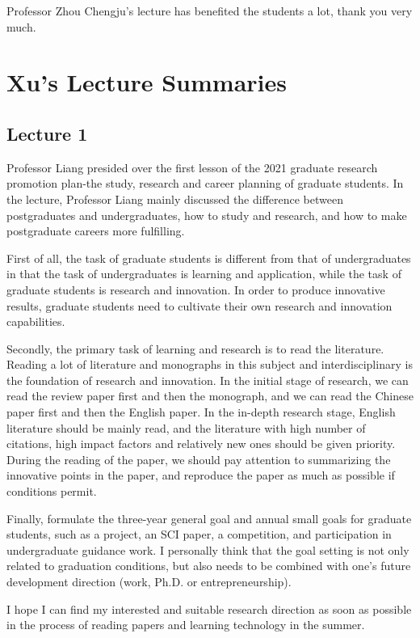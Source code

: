 \documentclass[UTF-8]{ctexart}
\begin{document}
Professor Zhou Chengju’s lecture has benefited the students a lot, thank you very much. 

\section{Xu's Lecture Summaries}

\subsection{Lecture 1}
Professor Liang presided over the first lesson of the 2021 graduate research promotion plan-the study, research and career planning of graduate students. In the lecture, Professor Liang mainly discussed the difference between postgraduates and undergraduates, how to study and research, and how to make postgraduate careers more fulfilling.

First of all, the task of graduate students is different from that of undergraduates in that the task of undergraduates is learning and application, while the task of graduate students is research and innovation. In order to produce innovative results, graduate students need to cultivate their own research and innovation capabilities.

Secondly, the primary task of learning and research is to read the literature. Reading a lot of literature and monographs in this subject and interdisciplinary is the foundation of research and innovation. In the initial stage of research, we can read the review paper first and then the monograph, and we can read the Chinese paper first and then the English paper. In the in-depth research stage, English literature should be mainly read, and the literature with high number of citations, high impact factors and relatively new ones should be given priority. During the reading of the paper, we should pay attention to summarizing the innovative points in the paper, and reproduce the paper as much as possible if conditions permit.

Finally, formulate the three-year general goal and annual small goals for graduate students, such as a project, an SCI paper, a competition, and participation in undergraduate guidance work. I personally think that the goal setting is not only related to graduation conditions, but also needs to be combined with one's future development direction (work, Ph.D. or entrepreneurship).

I hope I can find my interested and suitable research direction as soon as possible in the process of reading papers and learning technology in the summer.
\end{document}
